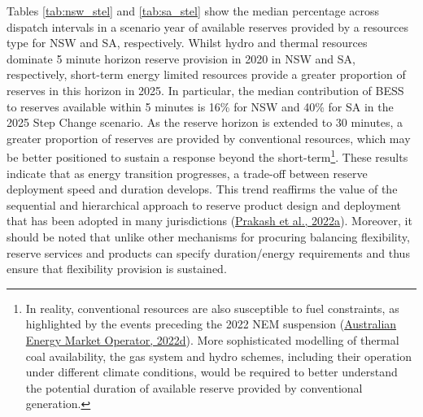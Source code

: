 \documentclass[12pt,a4paper,]{report}
\begin{document}
Tables \ref{tab:nsw_stel} and \ref{tab:sa_stel} show the median
percentage across dispatch intervals in a scenario year of available
reserves provided by a resources type for NSW and SA, respectively.
Whilst hydro and thermal resources dominate 5 minute horizon reserve
provision in 2020 in NSW and SA, respectively, short-term energy limited
resources provide a greater proportion of reserves in this horizon in
2025. In particular, the median contribution of BESS to reserves
available within 5 minutes is 16\% for NSW and 40\% for SA in the 2025
Step Change scenario. As the reserve horizon is extended to 30 minutes,
a greater proportion of reserves are provided by conventional resources,
which may be better positioned to sustain a response beyond the
short-term\footnote{In reality, conventional resources are also
  susceptible to fuel constraints, as highlighted by the events
  preceding the 2022 NEM suspension
  (\protect\hyperlink{ref-australianenergymarketoperatorNEMMarketSuspension2022}{Australian
  Energy Market Operator, 2022d}). More sophisticated modelling of
  thermal coal availability, the gas system and hydro schemes, including
  their operation under different climate conditions, would be required
  to better understand the potential duration of available reserve
  provided by conventional generation.}. These results indicate that as
energy transition progresses, a trade-off between reserve deployment
speed and duration develops. This trend reaffirms the value of the
sequential and hierarchical approach to reserve product design and
deployment that has been adopted in many jurisdictions
(\protect\hyperlink{ref-prakashInsightsDesigningEffective2022}{Prakash
et al., 2022a}). Moreover, it should be noted that unlike other
mechanisms for procuring balancing flexibility, reserve services and
products can specify duration/energy requirements and thus ensure that
flexibility provision is sustained.
\end{document}

